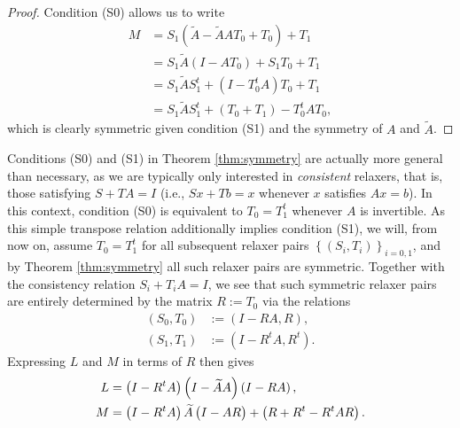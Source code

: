 \documentclass{article}
\begin{document}
\begin{proof}
Condition (S0) allows us to write
\begin{subequations}
\begin{align*}
M & = S_1 \left( \widetilde{A} - \widetilde{A} A T_0 + T_0 \right) + T_1 \\
  & = S_1 \widetilde{A} \left( I - A T_0 \right) + S_1 T_0 + T_1 \\
  & = S_1 \widetilde{A} S_1^t + \left( I - T_0^t A \right) T_0 + T_1 \\
  & = S_1 \widetilde{A} S_1^t + \left( T_0 + T_1 \right) - T_0^t A T_0,
\end{align*}
\end{subequations}
which is clearly symmetric given condition (S1) and the symmetry of $A$ and $\widetilde{A}$.
\end{proof}

Conditions (S0) and (S1) in Theorem \ref{thm:symmetry} are actually more general than necessary, as we are typically only interested in \emph{consistent} relaxers, that is, those satisfying $S + T A = I$ (i.e., $S x + T b = x$ whenever $x$ satisfies $A x = b$). In this context, condition (S0) is equivalent to $T_0 = T_1^t$ whenever $A$ is invertible. As this simple transpose relation additionally implies condition (S1), we will, from now on, assume $T_0 = T_1^t$ for all subsequent relaxer pairs $\left\{ \left( S_i, T_i \right) \right\}_{i = 0,1}$, and by Theorem \ref{thm:symmetry} all such relaxer pairs are symmetric. Together with the consistency relation $S_i + T_i A = I$, we see that such symmetric relaxer pairs are entirely determined by the matrix $R := T_0$ via the relations
\begin{subequations} \label{eq:RST}
\begin{align}
\left( S_0, T_0 \right) & := \left( I - R A, R \right), \\
\left( S_1, T_1 \right) & := \left( I - R^t A, R^t \right).
\end{align}
\end{subequations}
Expressing $L$ and $M$ in terms of $R$ then gives
\begin{subequations} \label{eq:RLM}
\begin{align}
L & = \left( I - R^t A \right) \left( I - \widetilde{A} A \right) \left( I - R A \right), \\
M & = \left( I - R^t A \right) \widetilde{A} \left( I - A R \vphantom{I - R^t A} \right) + \left( R + R^t - R^t A R \right).
\end{align}
\end{subequations}
\end{document}
